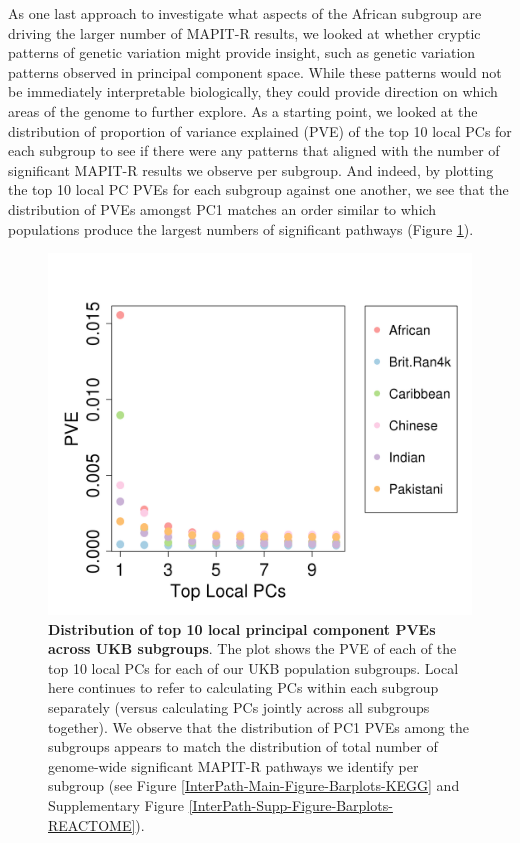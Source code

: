 \documentclass[12pt,a4paper]{article}
\begin{document}
As one last approach to investigate what aspects of the African subgroup are driving the larger number of MAPIT-R results, we looked at whether cryptic patterns of genetic variation might provide insight, such as genetic variation patterns observed in principal component space. While these patterns would not be immediately interpretable biologically, they could provide direction on which areas of the genome to further explore. As a starting point, we looked at the distribution of proportion of variance explained (PVE) of the top 10 local PCs for each subgroup to see if there were any patterns that aligned with the number of significant MAPIT-R results we observe per subgroup. And indeed, by plotting the top 10 local PC PVEs for each subgroup against one another, we see that the distribution of PVEs amongst PC1 matches an order similar to which populations produce the largest numbers of significant pathways (Figure \ref{InterPath-Main-Figure-Eigenvalues}).   

\begin{figure}[htb]
\centering
\includegraphics[scale=.45]{Images/Main/InterPath_Main_Figure_Eigenvalues_vs2.png}
\caption[TBD]{\textbf{Distribution of top 10 local principal component PVEs across UKB subgroups}. The plot shows the PVE of each of the top 10 local PCs for each of our UKB population subgroups. Local here continues to refer to calculating PCs within each subgroup separately (versus calculating PCs jointly across all subgroups together). We observe that the distribution of PC1 PVEs among the subgroups appears to match the distribution of total number of genome-wide significant MAPIT-R pathways we identify per subgroup (see Figure \ref{InterPath-Main-Figure-Barplots-KEGG} and  Supplementary Figure \ref{InterPath-Supp-Figure-Barplots-REACTOME}).}
\label{InterPath-Main-Figure-Eigenvalues}
\end{figure}
\end{document}
